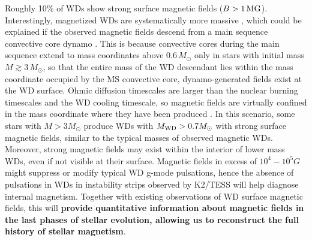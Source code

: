 
Roughly 10\% of WDs show strong surface magnetic fields ($B > 1 \, {\rm MG}$).
Interestingly, magnetized WDs are systematically more massive \cite{Ferrario_2015}, which could be explained if the observed magnetic fields descend from a main sequence convective core dynamo \cite{Cantiello_2016}. This is because convective cores during the main sequence extend to mass coordinates above $0.6 \, M_\odot$ only in stars with initial mass $M \! \gtrsim \! 3 \, M_\odot$, so that the entire mass of the WD descendant lies within the mass coordinate occupied by the MS convective core,  dynamo-generated fields exist at the WD surface. {\color{green} Ohmic diffusion timescales are larger than the nuclear burning timescales and the WD cooling timescale, so magnetic fields are virtually confined in the mass coordinate where they have been produced \cite{Cantiello_2016}.} In this scenario, some stars with $M>3M_\odot$ produce WDs with $M_{\rm WD}>0.7M_\odot$ with strong surface magnetic fields, similar to the typical masses of observed magnetic WDs. Moreover, strong magnetic fields may exist within the interior of lower mass WDs, even if not visible at their surface. Magnetic fields in excess of $10^4-10^5 G$ might suppress or modify typical WD g-mode pulsations, hence the absence of pulsations in WDs in instability strips observed by K2/TESS will help diagnose internal magnetism. Together with existing observations of WD surface magnetic fields, this will \textbf{provide quantitative information about magnetic fields in the last phases of stellar evolution, allowing us to reconstruct the full history of stellar magnetism}.